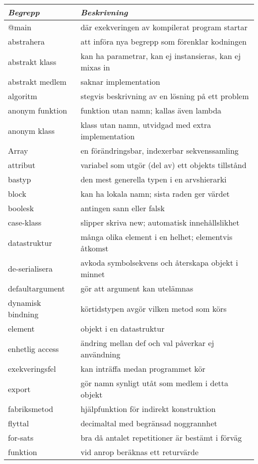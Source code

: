 \begin{tabular}{l|l}
\textit{Begrepp} & \textit{Beskrivning} \\ \hline \hline
@main & där exekveringen av kompilerat program startar \\
abstrahera & att införa nya begrepp som förenklar kodningen \\
abstrakt klass & kan ha parametrar, kan ej instansieras, kan ej mixas in \\
abstrakt medlem & saknar implementation \\
algoritm & stegvis beskrivning av en lösning på ett problem \\
anonym funktion & funktion utan namn; kallas även lambda \\
anonym klass & klass utan namn, utvidgad med extra implementation \\
Array & en förändringsbar, indexerbar sekvenssamling \\
attribut & variabel som utgör (del av) ett objekts tillstånd \\
bastyp & den mest generella typen i en arvshierarki \\
block & kan ha lokala namn; sista raden ger värdet \\
boolesk & antingen sann eller falsk \\
case-klass & slipper skriva new; automatisk innehållslikhet \\
datastruktur & många olika element i en helhet; elementvis åtkomst \\
de-serialisera & avkoda symbolsekvens och återskapa objekt i minnet \\
defaultargument & gör att argument kan utelämnas \\
dynamisk bindning & körtidstypen avgör vilken metod som körs \\
element & objekt i en datastruktur \\
enhetlig access & ändring mellan def och val påverkar ej användning \\
exekveringsfel & kan inträffa medan programmet kör \\
export & gör namn synligt utåt som medlem i detta objekt \\
fabriksmetod & hjälpfunktion för indirekt konstruktion \\
flyttal & decimaltal med begränsad noggrannhet \\
for-sats & bra då antalet repetitioner är bestämt i förväg \\
funktion & vid anrop beräknas ett returvärde \\

\end{tabular}
